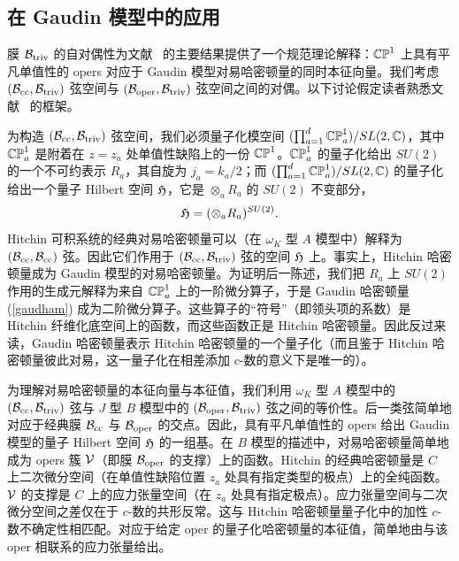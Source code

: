 \subsection{在 Gaudin 模型中的应用}\label{applic}

膜 $\Btriv$ 的自对偶性为文献~\cite{FFR,Frenkel} 的主要结果提供了一个规范理论解释：$\CP^1$ 上具有平凡单值性的 opers 对应于 Gaudin 模型对易哈密顿量的同时本征向量。我们考虑 $(\Bcc,\Btriv)$ 弦空间与 $(\Boper,\Btriv)$ 弦空间之间的对偶。以下讨论假定读者熟悉文献~\cite{GuWtwo} 的框架。


为构造 $(\Bcc,\Btriv)$ 弦空间，我们必须量子化模空间 $(\prod_{a=1}^d\CP^1_a)/SL(2,\C)$，其中 $\CP^1_a$ 是附着在 $z=z_a$ 处单值性缺陷上的一份 $\CP^1$。$\CP^1_a$ 的量子化给出 $SU(2)$ 的一个不可约表示 $R_a$，其自旋为 $j_a=k_a/2$；而 $(\prod_{a=1}^d\CP^1_a)/SL(2,\C)$ 的量子化给出一个量子 Hilbert 空间 $\frak H$，它是 $\otimes_a R_a$ 的 $SU(2)$ 不变部分，
\begin{equation}\label{ifo} \frak H=(\otimes_aR_a)^{SU(2)}. \end{equation}
Hitchin 可积系统的经典对易哈密顿量可以（在 $\omega_K$ 型 $A$ 模型中）解释为 $(\Bcc,\Bcc)$ 弦。因此它们作用于 $(\Bcc,\Btriv)$ 弦的空间 $\frak H$ 上。事实上，Hitchin 哈密顿量成为 Gaudin 模型的对易哈密顿量。为证明后一陈述，我们把 $R_a$ 上 $SU(2)$ 作用的生成元解释为来自 $\CP^1_a$ 上的一阶微分算子，于是 Gaudin 哈密顿量 (\ref{gaudham}) 成为二阶微分算子。这些算子的“符号”（即领头项的系数）是 Hitchin 纤维化底空间上的函数，而这些函数正是 Hitchin 哈密顿量。因此反过来读，Gaudin 哈密顿量表示 Hitchin 哈密顿量的一个量子化（而且鉴于 Hitchin 哈密顿量彼此对易，这一量子化在相差添加 $c$-数的意义下是唯一的）。


为理解对易哈密顿量的本征向量与本征值，我们利用 $\omega_K$ 型 $A$ 模型中的 $(\Bcc,\Btriv)$ 弦与 $J$ 型 $B$ 模型中的 $(\Boper,\Btriv)$ 弦之间的等价性。后一类弦简单地对应于经典膜 $\Bcc$ 与 $\Boper$ 的交点。因此，具有平凡单值性的 opers 给出 Gaudin 模型的量子 Hilbert 空间 $\frak H$ 的一组基。在 $B$ 模型的描述中，对易哈密顿量简单地成为 opers 簇 $\V$（即膜 $\Boper$ 的支撑）上的函数。Hitchin 的经典哈密顿量是 $C$ 上二次微分空间（在单值性缺陷位置 $z_a$ 处具有指定类型的极点）上的全纯函数。$\V$ 的支撑是 $C$ 上的应力张量空间（在 $z_a$ 处具有指定极点）。应力张量空间与二次微分空间之差仅在于 $c$-数的共形反常。这与 Hitchin 哈密顿量量子化中的加性 $c$-数不确定性相匹配。对应于给定 oper 的量子化哈密顿量的本征值，简单地由与该 oper 相联系的应力张量给出。

